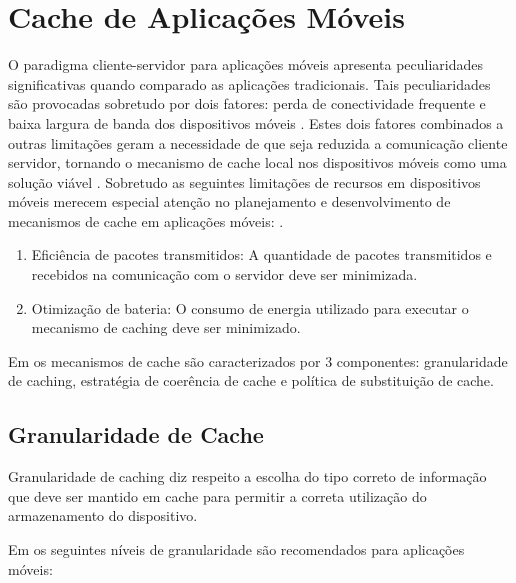 \documentclass[
	article,			%
	11pt,				%
	oneside,			%
	a4paper,			%
	english,			%
	brazil,				%
	sumario=tradicional
]{abntex2}
\begin{document}
\section{Cache de Aplicações Móveis}

O paradigma cliente-servidor para aplicações móveis apresenta peculiaridades significativas quando comparado as aplicações tradicionais. Tais peculiaridades são provocadas sobretudo por dois fatores: perda de conectividade frequente e baixa largura de banda dos dispositivos móveis \cite{rathore2007overview}.
Estes dois fatores combinados a outras limitações geram a necessidade de que seja reduzida a comunicação cliente servidor, tornando o mecanismo de cache local nos dispositivos móveis como uma solução viável \cite{rathore2007overview}.
Sobretudo as seguintes limitações de recursos em dispositivos móveis merecem especial atenção no planejamento e desenvolvimento de mecanismos de cache em aplicações móveis: \cite{rathore2007overview}.
\begin{enumerate}
	\item Eficiência de pacotes transmitidos:
	A quantidade de pacotes transmitidos e recebidos na comunicação com o servidor deve ser minimizada.
	
	\item Otimização de bateria:
	O consumo de energia utilizado para executar o mecanismo de caching deve ser minimizado.
\end{enumerate}
 
 Em \cite{rathore2007overview} os mecanismos de cache são caracterizados por 3 componentes: granularidade de caching, estratégia de coerência de cache e política de substituição de cache.
 


\subsection{Granularidade de Cache}
Granularidade de caching diz respeito a escolha do tipo correto de informação que deve ser mantido em cache para permitir a correta utilização do armazenamento do dispositivo.

Em \cite{rathore2007overview} os seguintes níveis de granularidade são recomendados para aplicações móveis:
\end{document}
